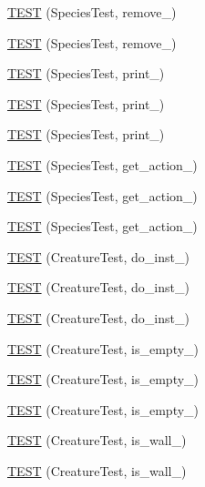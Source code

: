 \begin{DoxyCompactItemize}
\item 
\hyperlink{TestDarwin_8c_09_09_a6e0cc5d60ed2e9bdb0a2b70332428d93}{T\-E\-S\-T} (Species\-Test, remove\-\_)
\item 
\hyperlink{TestDarwin_8c_09_09_adaf74535e3f9c811bb19a073385457ad}{T\-E\-S\-T} (Species\-Test, remove\-\_)
\item 
\hyperlink{TestDarwin_8c_09_09_abe20d8b66311d30a219c14ecea861c2e}{T\-E\-S\-T} (Species\-Test, print\-\_)
\item 
\hyperlink{TestDarwin_8c_09_09_ada0b96343ca2610a9d738f64b5766647}{T\-E\-S\-T} (Species\-Test, print\-\_)
\item 
\hyperlink{TestDarwin_8c_09_09_a69125c684950fcd86100bd5b6bcd6d56}{T\-E\-S\-T} (Species\-Test, print\-\_)
\item 
\hyperlink{TestDarwin_8c_09_09_a14431a859ba7bba93babff8af7c0781e}{T\-E\-S\-T} (Species\-Test, get\-\_\-action\-\_)
\item 
\hyperlink{TestDarwin_8c_09_09_a97d1cc169563144e0481584313b422b8}{T\-E\-S\-T} (Species\-Test, get\-\_\-action\-\_)
\item 
\hyperlink{TestDarwin_8c_09_09_af37989daa1435cd544a1218c6b39323a}{T\-E\-S\-T} (Species\-Test, get\-\_\-action\-\_)
\item 
\hyperlink{TestDarwin_8c_09_09_a1bf57e81ed79dcf203452ea7f773a163}{T\-E\-S\-T} (Creature\-Test, do\-\_\-inst\-\_)
\item 
\hyperlink{TestDarwin_8c_09_09_a3332c1a5adfd47d7e49079ad91fbc646}{T\-E\-S\-T} (Creature\-Test, do\-\_\-inst\-\_)
\item 
\hyperlink{TestDarwin_8c_09_09_afbceaecc8e3f60bf1fc0f9c2650292ea}{T\-E\-S\-T} (Creature\-Test, do\-\_\-inst\-\_)
\item 
\hyperlink{TestDarwin_8c_09_09_a645d47d15ed72eaf38d46c7c29d0bff7}{T\-E\-S\-T} (Creature\-Test, is\-\_\-empty\-\_)
\item 
\hyperlink{TestDarwin_8c_09_09_acf73a24e566bb58704cd2372a9047c16}{T\-E\-S\-T} (Creature\-Test, is\-\_\-empty\-\_)
\item 
\hyperlink{TestDarwin_8c_09_09_a44c70932c73e4a4cf6bdc3bcd03b9efd}{T\-E\-S\-T} (Creature\-Test, is\-\_\-empty\-\_)
\item 
\hyperlink{TestDarwin_8c_09_09_a1b27269792b632221814eeabaf977604}{T\-E\-S\-T} (Creature\-Test, is\-\_\-wall\-\_)
\item 
\hyperlink{TestDarwin_8c_09_09_a86dc90e90d1e736514835f88ccb94456}{T\-E\-S\-T} (Creature\-Test, is\-\_\-wall\-\_)
\item 

\end{DoxyCompactItemize}
